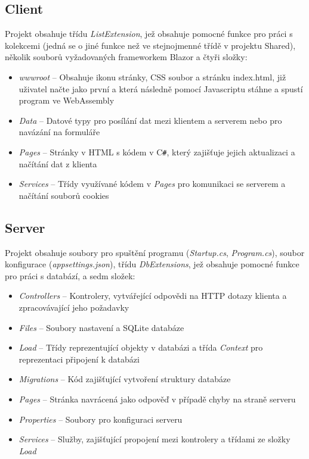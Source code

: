 \documentclass[a4paper,12pt]{article}
\def\CS{C\texttt{\#}}
\begin{document}
\subsection{Client}
Projekt obsahuje třídu \textit{ListExtension}, jež obsahuje pomocné funkce pro práci s kolekcemi (jedná se o jiné funkce než ve stejnojmenné třídě v projektu Shared), několik souborů vyžadovaných frameworkem Blazor a čtyři složky:
\begin{itemize}
\item\textit{wwwroot} -- Obsahuje ikonu stránky, CSS soubor a stránku index.html, již uživatel načte jako první a která následně pomocí Javascriptu stáhne a spustí program ve WebAssembly
\item\textit{Data} -- Datové typy pro posílání dat mezi klientem a serverem nebo pro navázání na formuláře
\item\textit{Pages} -- Stránky v HTML s kódem v  \CS{}, který zajišťuje jejich aktualizaci a načítání dat z klienta
\item\textit{Services} -- Třídy využívané kódem v \textit{Pages} pro komunikaci se serverem a načítání souborů cookies
\end{itemize}
\subsection{Server}
Projekt obsahuje soubory pro spuštění programu (\textit{Startup.cs}, \textit{Program.cs}), soubor konfigurace (\textit{appsettings.json}), třídu \textit{DbExtensions}, jež obsahuje pomocné funkce pro práci s databází, a sedm složek:
\begin{itemize}
\item\textit{Controllers} -- Kontrolery, vytvářející odpovědi na HTTP dotazy klienta a zpracovávající jeho požadavky
\item\textit{Files} -- Soubory nastavení a SQLite databáze
\item\textit{Load} -- Třídy reprezentující objekty v databázi a třída \textit{Context} pro reprezentaci připojení k databázi
\item\textit{Migrations} -- Kód zajišťující vytvoření struktury databáze
\item\textit{Pages} -- Stránka navrácená jako odpověď v případě chyby na straně serveru
\item\textit{Properties} -- Soubory pro konfiguraci serveru
\item\textit{Services} -- Služby, zajišťující propojení mezi kontrolery a třídami ze složky \textit{Load}
\end{itemize}
\newpage
\printbibliography[heading=bibintoc, title={Použitá literatura}]
\end{document}
